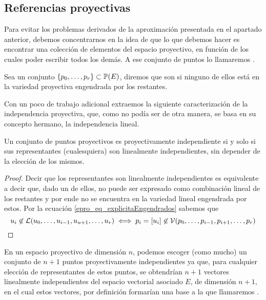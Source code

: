 \subsection{Referencias proyectivas}
Para evitar los problemas derivados de la aproximación presentada en el apartado anterior, debemos concentrarnos en la idea de que lo que debemos hacer es encontrar una colección de elementos del espacio proyectivo, en función de los cuales poder escribir todos los demás. A ese conjunto de puntos lo llamaremos .
\begin{defi}
	\label{epro_def_independenciaProyectiva}
	Sea un conjunto $\{p_0,\dots,p_r\}\subset\mathbb{P}(E)$, diremos que son  si ninguno de ellos está en la variedad proyectiva engendrada por los restantes.
\end{defi}
Con un poco de trabajo adicional extraemos la siguiente caracterización de la independencia proyectiva, que, como no podía ser de otra manera, se basa en su concepto hermano, la independencia lineal.
\begin{lem}
	\label{epro_lem_caracterizacionIndependencia}
	Un conjunto de puntos proyectivos es proyectivamente independiente si y solo si sus representantes (cualesquiera) son linealmente independientes, sin depender de la elección de los mismos. 
\end{lem}
\begin{proof}
	Decir que los representantes son linealmente independientes es equivalente a decir que, dado un de ellos, no puede ser expresado como combinación lineal de los restantes y por ende no se encuentra en la variedad lineal engendrada por estos. Por la ecuación \eqref{epro_eq_explicitaEngendrados} sabemos que
	\begin{equation*}
		u_i\not\in\mathcal{L}(u_0,\dots,u_{i-1},u_{u+1},\dots,u_{r})\iff p_i=\left [ u_i \right ]\not\in\mathcal{V}(p_0,\dots,p_{i-1},p_{i+1},\dots,p_r)\qedhere
	\end{equation*}
\end{proof}
\begin{obs}
	\label{epro_obs_baseInducida}
	En un espacio proyectivo de dimensión $n$, podemos escoger (como mucho) un conjunto de $n+1$ puntos proyectivamente independientes ya que, para cualquier elección de representantes de estos puntos, se obtendrían $n+1$ vectores linealmente independientes del espacio vectorial asociado $E$, de dimensión $n+1$, en el cual estos vectores, por definición formarían una base a la que llamaremos .
\end{obs}
